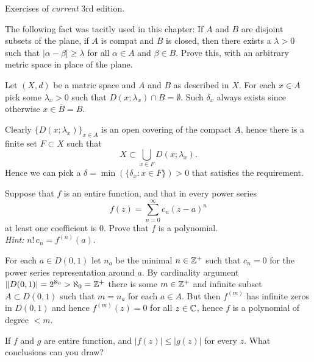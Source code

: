 Exercises of \emph{current} 3rd edition.

\begin{enumerate}

\begin{excopy}
The following fact was tacitly used in this chapter:
If $A$ and $B$ are disjoint subsets of the plane,
if $A$ is compat and $B$ is closed, then there exists a \(\lambda > 0\)
such that \(|\alpha - \beta| \geq \lambda\) for all
\(\alpha \in A\) and \(\beta \in B\).
Prove this, with an arbitrary metric space in place of the plane.
\end{excopy}

Let \((X,d)\) be a matric space and $A$ and $B$ as described in $X$.
For each \(x\in A\) pick some \(\lambda_x>0\) such that
\(D(x;\lambda_x) \cap B = \emptyset\). Such \(\delta_x\) always exists
since otherwise \(x \in \overline{B}=B\).

Clearly \(\{D(x;\lambda_x)\}_{x\in A}\) is an open covering of the compact $A$,
hence there is a finite set \(F\subset X\) such that
\begin{equation*}
 X \subset \bigcup_{x\in F} D(x;\lambda_x).
\end{equation*}
Hence we can pick a \(\delta = \min(\{\delta_x: x\in F\}) > 0\)
that satisfies the requirement.


\begin{excopy}
Suppose that $f$ is an entire function,
and that in every  power series
\begin{equation*}
f(z) = \sum_{n=0}^\infty c_n(z-a)^n
\end{equation*}
at least one coefficient is $0$. Prove that $f$ is a polynomial.
\\ \emph{Hint:} \(n!\,c_n = f^{(n)}(a)\).
\end{excopy}

For each \(a\in D(0,1)\) let \(n_a\) be the minimal \(n\in\mathbb{Z}^+\) such that
\(c_n=0\) for the power series representation around $a$.
By cardinality argument \(\|D(0,1)|=2^{\aleph_0} > \aleph_0 = \mathbb{Z}^+\)
there is some \(m\in\mathbb{Z}^+\) and infinite subset \(A\subset D(0,1)\)
such that \(m=n_a\) for each \(a\in A\).
But then \(f^{(m)}\) has infinite zeros in \(D(0,1)\)
and hence \(f^{(m)}(z) = 0\) for all \(z\in\mathbb{C}\),
hence $f$ is a polynomial of degree  \(<m\).

\begin{excopy}
If $f$ and $g$ are entire function, and \(|f(z)| \leq |g(z)|\)
for every $z$. What conclusions can you draw?
\end{excopy}


\end{enumerate}
